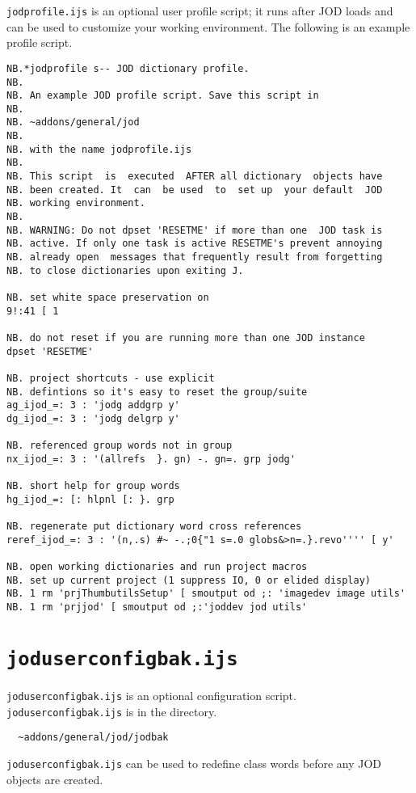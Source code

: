\verb|jodprofile.ijs| is an optional user profile script; it runs after
JOD loads and can be used to customize your working environment.  The following is an example
profile script. 


\begin{lstlisting}[frame=single,framerule=0pt,basicstyle=\ttfamily\footnotesize]
NB.*jodprofile s-- JOD dictionary profile.
NB.
NB. An example JOD profile script. Save this script in
NB.
NB. ~addons/general/jod
NB.
NB. with the name jodprofile.ijs
NB.
NB. This script  is  executed  AFTER all dictionary  objects have
NB. been created. It  can  be used  to  set up  your default  JOD
NB. working environment.
NB.
NB. WARNING: Do not dpset 'RESETME' if more than one  JOD task is
NB. active. If only one task is active RESETME's prevent annoying
NB. already open  messages that frequently result from forgetting
NB. to close dictionaries upon exiting J.

NB. set white space preservation on
9!:41 [ 1

NB. do not reset if you are running more than one JOD instance
dpset 'RESETME'

NB. project shortcuts - use explicit 
NB. defintions so it's easy to reset the group/suite
ag_ijod_=: 3 : 'jodg addgrp y'
dg_ijod_=: 3 : 'jodg delgrp y'
   
NB. referenced group words not in group
nx_ijod_=: 3 : '(allrefs  }. gn) -. gn=. grp jodg'
   
NB. short help for group words
hg_ijod_=: [: hlpnl [: }. grp

NB. regenerate put dictionary word cross references
reref_ijod_=: 3 : '(n,.s) #~ -.;0{"1 s=.0 globs&>n=.}.revo'''' [ y'

NB. open working dictionaries and run project macros
NB. set up current project (1 suppress IO, 0 or elided display)
NB. 1 rm 'prjThumbutilsSetup' [ smoutput od ;: 'imagedev image utils'
NB. 1 rm 'prjjod' [ smoutput od ;:'joddev jod utils'
\end{lstlisting}

   \newpage
   \section{\texttt{joduserconfigbak.ijs}}\label{ap:jodusercfgbak}
   
\verb|joduserconfigbak.ijs| is an optional configuration 
script. \verb|joduserconfigbak.ijs| is in the directory.
\begin{verbatim}
  ~addons/general/jod/jodbak
\end{verbatim}
\verb|joduserconfigbak.ijs| can be used to redefine class words before
any JOD objects are created. 
   
